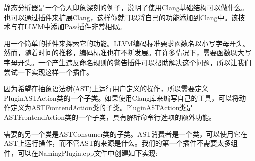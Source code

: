 静态分析器是一个令人印象深刻的例子，说明了使用Clang基础结构可以做什么。也可以通过插件来扩展Clang，这样你就可以将自己的功能添加到Clang中。该技术与在LLVM中添加Pass插件非常相似。\par

用一个简单的插件来探索它的功能。LLVM编码标准要求函数名以小写字母开头。然而，随着时间的推移，编码标准也在不断发展。在许多情况下，需要函数以大写字母开头。一个产生违反命名规则的警告插件可以帮助解决这个问题，所以让我们尝试一下实现这样一个插件。\par

因为希望在抽象语法树(AST)上运行用户定义的操作，所以需要定义PluginASTAction类的一个子类。如果使用Clang库来编写自己的工具，可以将动作定义为ASTFrontendAction类的子类。PluginASTAction类是ASTFrontendAction类的一个子类，具有解析命令行选项的额外功能。\par

需要的另一个类是ASTConsumer类的子类。AST消费者是一个类，可以使用它在AST上运行操作，而不管AST的来源是什么。我们的第一个插件不需要太多组件，可以在NamingPlugin.cpp文件中创建如下实现:\par


